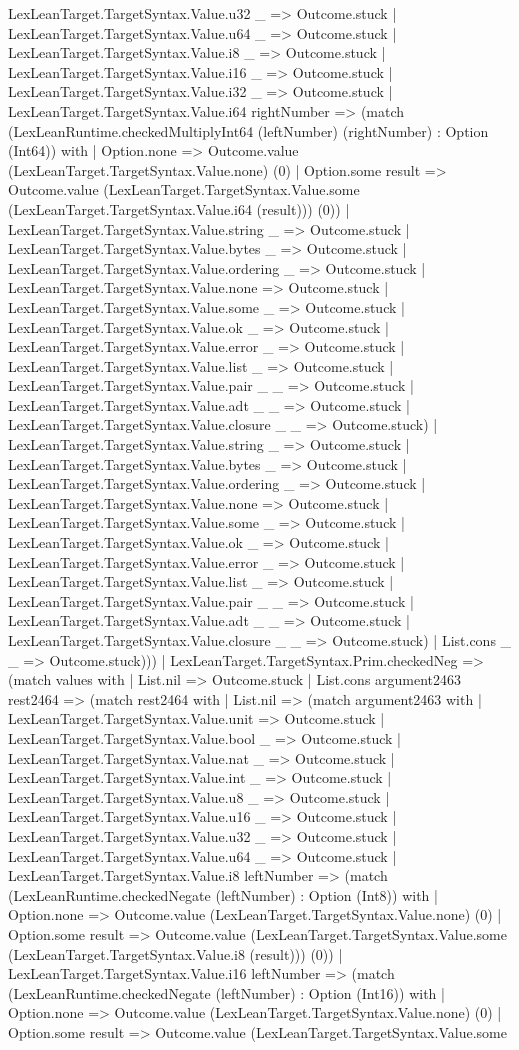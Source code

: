 \documentclass[11pt]{article}
\begin{document}
LexLeanTarget.TargetSyntax.Value.u32 \_ => Outcome.stuck | LexLeanTarget.TargetSyntax.Value.u64 \_ => Outcome.stuck | LexLeanTarget.TargetSyntax.Value.i8 \_ => Outcome.stuck | LexLeanTarget.TargetSyntax.Value.i16 \_ => Outcome.stuck | LexLeanTarget.TargetSyntax.Value.i32 \_ => Outcome.stuck | LexLeanTarget.TargetSyntax.Value.i64 rightNumber => (match (LexLeanRuntime.checkedMultiplyInt64 (leftNumber) (rightNumber) : Option (Int64)) with | Option.none => Outcome.value (LexLeanTarget.TargetSyntax.Value.none) (0) | Option.some result => Outcome.value (LexLeanTarget.TargetSyntax.Value.some (LexLeanTarget.TargetSyntax.Value.i64 (result))) (0)) | LexLeanTarget.TargetSyntax.Value.string \_ => Outcome.stuck | LexLeanTarget.TargetSyntax.Value.bytes \_ => Outcome.stuck | LexLeanTarget.TargetSyntax.Value.ordering \_ => Outcome.stuck | LexLeanTarget.TargetSyntax.Value.none => Outcome.stuck | LexLeanTarget.TargetSyntax.Value.some \_ => Outcome.stuck | LexLeanTarget.TargetSyntax.Value.ok \_ => Outcome.stuck | LexLeanTarget.TargetSyntax.Value.error \_ => Outcome.stuck | LexLeanTarget.TargetSyntax.Value.list \_ => Outcome.stuck | LexLeanTarget.TargetSyntax.Value.pair \_ \_ => Outcome.stuck | LexLeanTarget.TargetSyntax.Value.adt \_ \_ => Outcome.stuck | LexLeanTarget.TargetSyntax.Value.closure \_ \_ => Outcome.stuck) | LexLeanTarget.TargetSyntax.Value.string \_ => Outcome.stuck | LexLeanTarget.TargetSyntax.Value.bytes \_ => Outcome.stuck | LexLeanTarget.TargetSyntax.Value.ordering \_ => Outcome.stuck | LexLeanTarget.TargetSyntax.Value.none => Outcome.stuck | LexLeanTarget.TargetSyntax.Value.some \_ => Outcome.stuck | LexLeanTarget.TargetSyntax.Value.ok \_ => Outcome.stuck | LexLeanTarget.TargetSyntax.Value.error \_ => Outcome.stuck | LexLeanTarget.TargetSyntax.Value.list \_ => Outcome.stuck | LexLeanTarget.TargetSyntax.Value.pair \_ \_ => Outcome.stuck | LexLeanTarget.TargetSyntax.Value.adt \_ \_ => Outcome.stuck | LexLeanTarget.TargetSyntax.Value.closure \_ \_ => Outcome.stuck) | List.cons \_ \_ => Outcome.stuck))) | LexLeanTarget.TargetSyntax.Prim.checkedNeg => (match values with | List.nil => Outcome.stuck | List.cons argument2463 rest2464 => (match rest2464 with | List.nil => (match argument2463 with | LexLeanTarget.TargetSyntax.Value.unit => Outcome.stuck | LexLeanTarget.TargetSyntax.Value.bool \_ => Outcome.stuck | LexLeanTarget.TargetSyntax.Value.nat \_ => Outcome.stuck | LexLeanTarget.TargetSyntax.Value.int \_ => Outcome.stuck | LexLeanTarget.TargetSyntax.Value.u8 \_ => Outcome.stuck | LexLeanTarget.TargetSyntax.Value.u16 \_ => Outcome.stuck | LexLeanTarget.TargetSyntax.Value.u32 \_ => Outcome.stuck | LexLeanTarget.TargetSyntax.Value.u64 \_ => Outcome.stuck | LexLeanTarget.TargetSyntax.Value.i8 leftNumber => (match (LexLeanRuntime.checkedNegate (leftNumber) : Option (Int8)) with | Option.none => Outcome.value (LexLeanTarget.TargetSyntax.Value.none) (0) | Option.some result => Outcome.value (LexLeanTarget.TargetSyntax.Value.some (LexLeanTarget.TargetSyntax.Value.i8 (result))) (0)) | LexLeanTarget.TargetSyntax.Value.i16 leftNumber => (match (LexLeanRuntime.checkedNegate (leftNumber) : Option (Int16)) with | Option.none => Outcome.value (LexLeanTarget.TargetSyntax.Value.none) (0) | Option.some result => Outcome.value (LexLeanTarget.TargetSyntax.Value.some 
\end{document}
